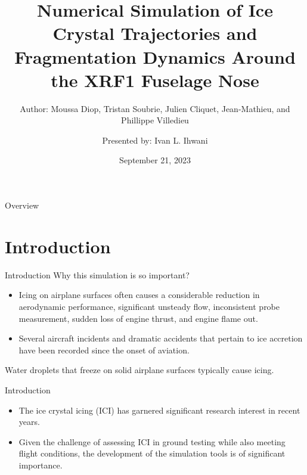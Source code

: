 \documentclass[aspectratio=169,xcolor=dvipsnames]{beamer}
\title[Num. Simulation of Ice Crystal Traj. \& Frag. Dyn.]{Numerical Simulation of Ice Crystal Trajectories and Fragmentation Dynamics Around the XRF1 Fuselage Nose} %
\subtitle{Author: Moussa Diop, Tristan Soubrie, Julien Cliquet, Jean-Mathieu, and Phillippe Villedieu}
\author[Ivan L. Ihwani]{Presented by: Ivan L. Ihwani}
\institute[SIAM NEWS SEPTEMBER 2023]{Department of Mathematics \newline National Central University}
\date{September 21, 2023} %
\begin{document}
\begin{frame}[plain]
    \titlepage
\end{frame}

\begin{frame}{Overview}
    \tableofcontents
\end{frame}

\section{Introduction}
\begin{frame}{Introduction}
Why this simulation is so important?
    \begin{itemize}
    \item Icing on airplane surfaces often causes a considerable reduction in aerodynamic performance, significant unsteady flow, inconsistent probe measurement, sudden loss of engine thrust, and engine flame out. 
    \item Several aircraft incidents and dramatic accidents that pertain to ice accretion have been recorded since the onset of aviation. 
    \end{itemize}
Water droplets that freeze on solid airplane surfaces typically cause icing. 
\end{frame}

\begin{frame}{Introduction}
    \begin{itemize}
    \item The ice crystal icing (ICI) has garnered significant research interest in recent years. 
    \item Given the challenge of assessing ICI in ground testing while also meeting flight conditions, the development of the simulation tools is of significant importance.
    \end{itemize}
\end{frame}
\end{document}
